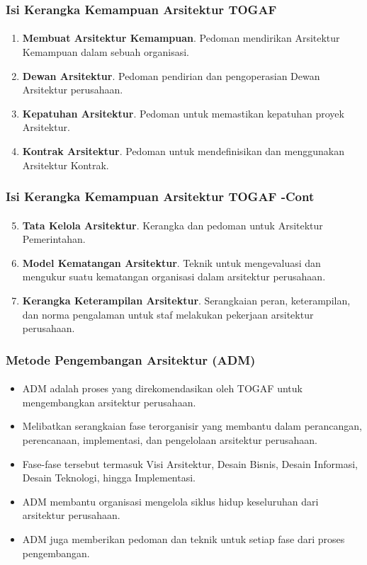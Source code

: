 \documentclass[aspectratio=169, table]{beamer}
\begin{document}
	\begin{frame}
		\frametitle{Isi Kerangka Kemampuan Arsitektur TOGAF}
		\framesubtitle{\hspace{1cm}}
		\begin{enumerate}
			\item \textbf{Membuat Arsitektur Kemampuan}. Pedoman mendirikan Arsitektur Kemampuan
			dalam sebuah organisasi.
			\item \textbf{Dewan Arsitektur}. Pedoman pendirian dan pengoperasian Dewan Arsitektur perusahaan.
			\item \textbf{Kepatuhan Arsitektur}. Pedoman untuk memastikan kepatuhan proyek Arsitektur.
			\item \textbf{Kontrak Arsitektur}. Pedoman untuk mendefinisikan dan menggunakan Arsitektur Kontrak.
		\end{enumerate}
	\end{frame}
	
		\begin{frame}
		\frametitle{Isi Kerangka Kemampuan Arsitektur TOGAF -Cont}
		\framesubtitle{\hspace{1cm}}
		\begin{enumerate}
			\setcounter{enumi}{4}
			\item \textbf{Tata Kelola Arsitektur}. Kerangka dan pedoman untuk Arsitektur Pemerintahan.
			\item \textbf{Model Kematangan Arsitektur}. Teknik untuk mengevaluasi dan mengukur suatu kematangan organisasi dalam arsitektur perusahaan.
			\item \textbf{Kerangka Keterampilan Arsitektur}. Serangkaian peran, keterampilan, dan norma pengalaman untuk staf melakukan pekerjaan arsitektur perusahaan.
		\end{enumerate}
	\end{frame}
	
	
	\begin{frame}
		\frametitle{Metode Pengembangan Arsitektur (ADM)}
		\framesubtitle{\hspace{1cm}}
		\begin{itemize}
			\item ADM adalah proses yang direkomendasikan oleh TOGAF untuk mengembangkan arsitektur perusahaan.
			\item Melibatkan serangkaian fase terorganisir yang membantu dalam perancangan, perencanaan, implementasi, dan pengelolaan arsitektur perusahaan.
			\item Fase-fase tersebut termasuk Visi Arsitektur, Desain Bisnis, Desain Informasi, Desain Teknologi, hingga Implementasi.
			\item ADM membantu organisasi mengelola siklus hidup keseluruhan dari arsitektur perusahaan.
			\item ADM juga memberikan pedoman dan teknik untuk setiap fase dari proses pengembangan.
		\end{itemize}
	\end{frame}
	
\end{document}
